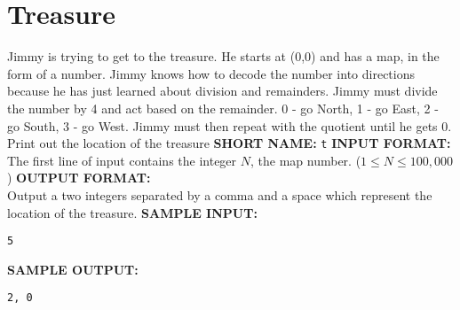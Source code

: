 \documentclass[twoside]{article}
\newcommand{\blank}{\vskip 3mm}
\begin{document}



\section{Treasure}
Jimmy is trying to get to the treasure. He starts at (0,0) and has a map, in the form of a number. Jimmy knows how to decode the number into directions because he has just learned about division and remainders. Jimmy must divide the number by 4 and act based on the remainder. 0 - go North, 1 - go East, 2 - go South, 3 - go West. Jimmy must then repeat with the quotient until he gets 0.
\blank
Print out the location of the treasure 
\blank
\textbf{SHORT NAME:} \verb|t|
\blank
\textbf{INPUT FORMAT:}\\
The first line of input contains the integer $ N $, the map number. ($1 \leq N \leq 100,000$)
\blank
\textbf{OUTPUT FORMAT:}\\
Output a two integers separated by a comma and a space which represent the location of the treasure.
\blank
\textbf{SAMPLE INPUT:}
\begin{verbatim}
5
\end{verbatim}
\textbf{SAMPLE OUTPUT:}
\begin{verbatim}
2, 0
\end{verbatim}
\end{document}
